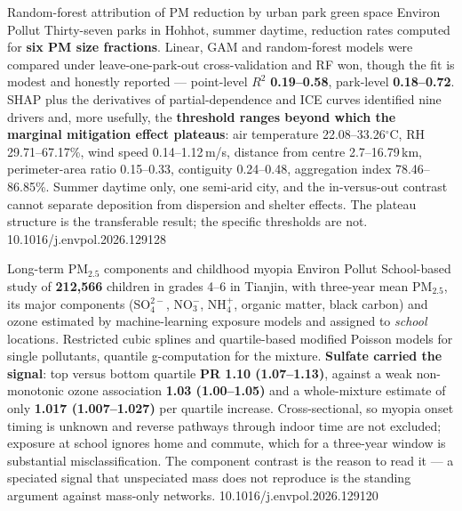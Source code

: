 \documentclass[10pt]{article}
\begin{document}
{Random-forest attribution of PM reduction by urban park green space}
{Environ Pollut}
{Thirty-seven parks in Hohhot, summer daytime, reduction rates computed for \textbf{six PM
size fractions}. Linear, GAM and random-forest models were compared under leave-one-park-out
cross-validation and RF won, though the fit is modest and honestly reported --- point-level
$R^2$ \textbf{0.19--0.58}, park-level \textbf{0.18--0.72}. SHAP plus the derivatives of
partial-dependence and ICE curves identified nine drivers and, more usefully, the
\textbf{threshold ranges beyond which the marginal mitigation effect plateaus}: air
temperature 22.08--33.26$^\circ$C, RH 29.71--67.17\%, wind speed 0.14--1.12\,m/s, distance
from centre 2.7--16.79\,km, perimeter-area ratio 0.15--0.33, contiguity 0.24--0.48,
aggregation index 78.46--86.85\%. Summer daytime only, one semi-arid city, and the
in-versus-out contrast cannot separate deposition from dispersion and shelter effects. The
plateau structure is the transferable result; the specific thresholds are not.}
{10.1016/j.envpol.2026.129128}


{Long-term PM$_{2.5}$ components and childhood myopia}
{Environ Pollut}
{School-based study of \textbf{212{,}566} children in grades 4--6 in Tianjin, with three-year
mean PM$_{2.5}$, its major components (SO$_4^{2-}$, NO$_3^-$, NH$_4^+$, organic matter, black
carbon) and ozone estimated by machine-learning exposure models and assigned to \emph{school}
locations. Restricted cubic splines and quartile-based modified Poisson models for single
pollutants, quantile g-computation for the mixture. \textbf{Sulfate carried the signal}: top
versus bottom quartile \textbf{PR 1.10 (1.07--1.13)}, against a weak non-monotonic ozone
association \textbf{1.03 (1.00--1.05)} and a whole-mixture estimate of only \textbf{1.017
(1.007--1.027)} per quartile increase. Cross-sectional, so myopia onset timing is unknown and
reverse pathways through indoor time are not excluded; exposure at school ignores home and
commute, which for a three-year window is substantial misclassification. The component
contrast is the reason to read it --- a speciated signal that unspeciated mass does not
reproduce is the standing argument against mass-only networks.}
{10.1016/j.envpol.2026.129120}

\end{document}

